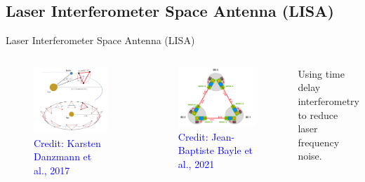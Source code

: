 \documentclass[pdf]{beamer}
\newcommand{\credit}[1]{\tiny{\textcolor{blue}{Credit: #1}}}
\begin{document}
\subsection{Laser Interferometer Space Antenna (LISA)}
\begin{frame}{Laser Interferometer Space Antenna (LISA)}
\begin{columns}

\begin{figure}
\includegraphics[scale=.15]{fig/LISA.png}
\caption*{\credit{Karsten Danzmann et al., 2017}}
\end{figure}

\begin{figure}
\includegraphics[scale=.12]{fig/LISAsch.png}
\caption*{\credit{Jean-Baptiste Bayle et al., 2021}}
\end{figure}
Using time delay interferometry to reduce laser frequency noise.

\end{columns}
\end{frame}
\end{document}
